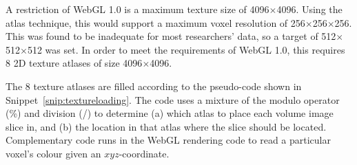 A restriction of WebGL 1.0 is a maximum texture size of 4096$\times$4096.
Using the atlas technique, this would support a maximum voxel resolution of 256$\times$256$\times$256.
This was found to be inadequate for most researchers' data, so a target of 512$\times$512$\times$512 was set.
In order to meet the requirements of WebGL 1.0, this requires 8 2D texture atlases of size 4096$\times$4096.

The 8 texture atlases are filled according to the pseudo-code shown in Snippet~\ref{snip:textureloading}.
The code uses a mixture of the modulo operator (\%) and division (/) to determine (a) which atlas to place each volume image slice in, and (b) the location in that atlas where the slice should be located.
Complementary code runs in the WebGL rendering code to read a particular voxel's colour given an $xyz$-coordinate.

